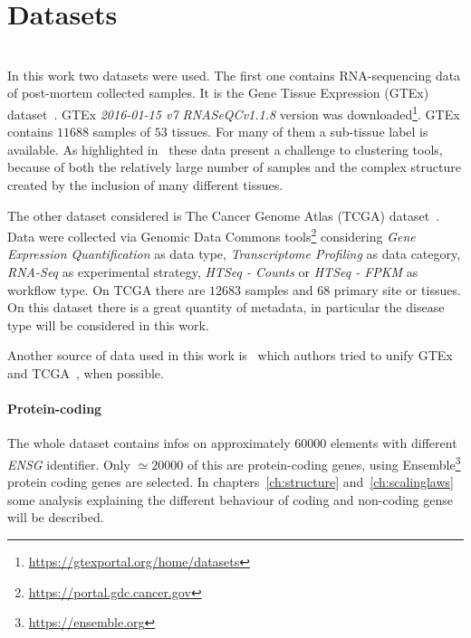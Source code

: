 \section{Datasets}\mbox{}\\
In this work two datasets were used. The first one contains RNA-sequencing data of post-mortem collected samples. It is the Gene Tissue Expression (GTEx) dataset~\cite{carithers2015novel}. GTEx \textit{2016-01-15 v7 RNASeQCv1.1.8} version was downloaded\footnote{\url{https://gtexportal.org/home/datasets}}.
GTEx contains $11688$ samples of $53$ tissues. For many of them a sub-tissue label is available. As highlighted in~\cite{dey2017visualizing} these data present a challenge to clustering tools, because of both the relatively large number of samples and the complex structure created by the inclusion of many different tissues.

The other dataset considered is The Cancer Genome Atlas (TCGA) dataset~\cite{grossman2016toward}. Data were collected via Genomic Data Commons tools\footnote{\url{https://portal.gdc.cancer.gov}} considering \textit{Gene Expression Quantification} as data type, \textit{Transcriptome Profiling} as data category, \textit{RNA-Seq} as experimental strategy, \textit{HTSeq - Counts} or \textit{HTSeq - FPKM} as workflow type. On TCGA there are $12683$ samples and $68$ primary site or tissues. On this dataset there is a great quantity of metadata, in particular the disease type will be considered in this work.

Another source of data used in this work is~\cite{Wang2017} which authors tried to unify GTEx and TCGA~\cite{Betel2018}, when possible.

\paragraph{Protein-coding}
The whole dataset contains infos on approximately $60000$ elements with different \textit{ENSG} identifier. Only $\simeq 20000$ of this are protein-coding genes, using Ensemble\footnote{\url{https://ensemble.org}} protein coding genes are selected. In chapters~\ref{ch:structure} and~\ref{ch:scalinglaws} some analysis explaining the different behaviour of coding and non-coding gense will be described.